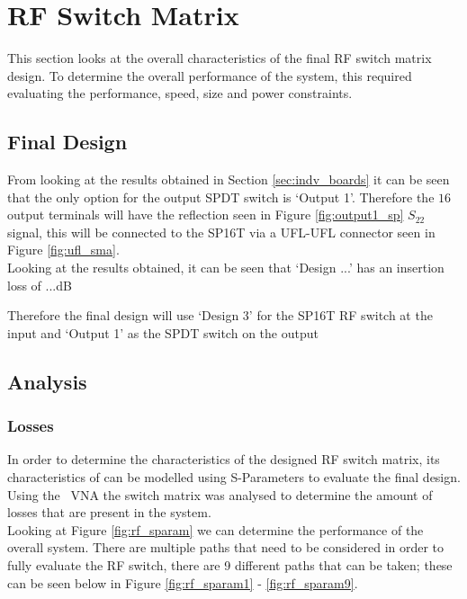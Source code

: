 \documentclass[12pt,openany,a4paper]{book}
\begin{document}
\section{RF Switch Matrix}
This section looks at the overall characteristics of the final RF switch matrix design. To determine the overall performance of the system, this required evaluating the performance, speed, size and power constraints.

\subsection{Final Design}
From looking at the results obtained in Section \ref{sec:indv_boards} it can be seen that the only option for the output SPDT switch is `Output 1'. Therefore the $16$ output terminals will have the reflection seen in Figure \ref{fig:output1_sp} $S_{22}$ signal, this will be connected to the SP16T via a UFL-UFL connector seen in Figure \ref{fig:ufl_sma}. \\
Looking at the results obtained, it can be seen that `Design ...' has an insertion loss of ...dB 


Therefore the final design will use `Design 3' for the SP16T RF switch at the input and `Output 1' as the SPDT switch on the output

\subsection{Analysis}

\subsubsection{Losses}
In order to determine the characteristics of the designed RF switch matrix, its characteristics of can be modelled using S-Parameters to evaluate the final design. Using the \model \ VNA the switch matrix was analysed to determine the amount of losses that are present in the system. \\
Looking at Figure \ref{fig:rf_sparam} we can determine the performance of the overall system. There are multiple paths that need to be considered in order to fully evaluate the RF switch, there are 9 different paths that can be taken; these can be seen below in Figure \ref{fig:rf_sparam1} - \ref{fig:rf_sparam9}.
\end{document}
